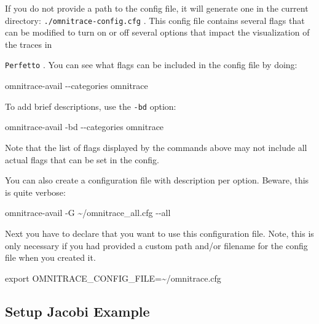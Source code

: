 \documentclass[
]{article}
\let\oldtexttt\texttt
\renewcommand{\texttt}[1]{
  \colorbox{Light}{\oldtexttt{#1}}
}
\newenvironment{Shaded}{}{}
\newcommand{\BuiltInTok}[1]{#1}
\newcommand{\ExtensionTok}[1]{#1}
\newcommand{\NormalTok}[1]{#1}
\newcommand{\VariableTok}[1]{\textcolor[rgb]{0.10,0.09,0.49}{#1}}
\begin{document}
If you do not provide a path to the config file, it will generate one in
the current directory: \texttt{./omnitrace-config.cfg}. This config file
contains several flags that can be modified to turn on or off several
options that impact the visualization of the traces in
\texttt{Perfetto}. You can see what flags can be included in the config
file by doing:

\begin{Shaded}
\begin{Highlighting}[]
\ExtensionTok{omnitrace{-}avail}\NormalTok{ {-}{-}categories omnitrace}
\end{Highlighting}
\end{Shaded}

To add brief descriptions, use the \texttt{-bd} option:

\begin{Shaded}
\begin{Highlighting}[]
\ExtensionTok{omnitrace{-}avail}\NormalTok{ {-}bd {-}{-}categories omnitrace}
\end{Highlighting}
\end{Shaded}

Note that the list of flags displayed by the commands above may not
include all actual flags that can be set in the config.

You can also create a configuration file with description per option.
Beware, this is quite verbose:

\begin{Shaded}
\begin{Highlighting}[]
\ExtensionTok{omnitrace{-}avail}\NormalTok{ {-}G \textasciitilde{}/omnitrace\_all.cfg {-}{-}all}
\end{Highlighting}
\end{Shaded}

Next you have to declare that you want to use this configuration file.
Note, this is only necessary if you had provided a custom path and/or
filename for the config file when you created it.

\begin{Shaded}
\begin{Highlighting}[]
\BuiltInTok{export} \VariableTok{OMNITRACE\_CONFIG\_FILE=}\NormalTok{\textasciitilde{}/omnitrace.cfg}
\end{Highlighting}
\end{Shaded}

\hypertarget{setup-jacobi-example}{%
\subsection{Setup Jacobi Example}\label{setup-jacobi-example}}
\end{document}
